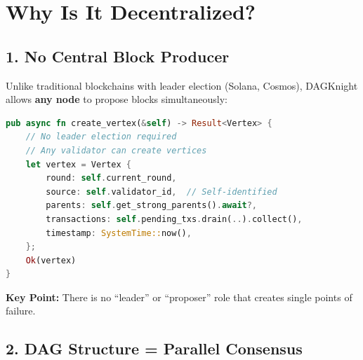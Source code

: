 \documentclass[a5paper,11pt]{article}
\begin{document}
\section{Why Is It Decentralized?}

\subsection{1. No Central Block Producer}

Unlike traditional blockchains with leader election (Solana, Cosmos), DAGKnight allows \textbf{any node} to propose blocks simultaneously:

\begin{lstlisting}[language=Rust, caption=vertex\_creator.rs - Any node can create blocks]
pub async fn create_vertex(&self) -> Result<Vertex> {
    // No leader election required
    // Any validator can create vertices
    let vertex = Vertex {
        round: self.current_round,
        source: self.validator_id,  // Self-identified
        parents: self.get_strong_parents().await?,
        transactions: self.pending_txs.drain(..).collect(),
        timestamp: SystemTime::now(),
    };
    Ok(vertex)
}
\end{lstlisting}

\textbf{Key Point:} There is no ``leader'' or ``proposer'' role that creates single points of failure.

\subsection{2. DAG Structure = Parallel Consensus}

\begin{center}
\end{center}
\end{document}
